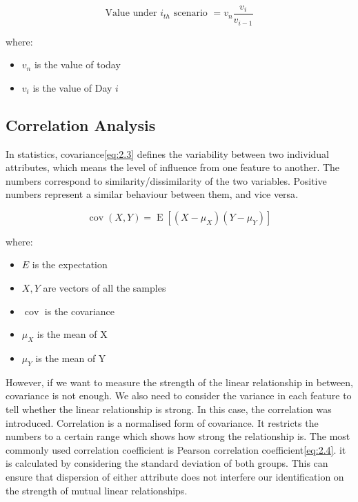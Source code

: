 \documentclass[11pt]{article} %
\theoremstyle{plain}
\theoremstyle{definition}
\begin{document}
{
  \begin{equation}
    \label{eq:2.2}
    \tag{2.2}
    {\text{Value under } i_{th} \text{ scenario } = v_{n}\frac{v_{i}}{v_{i-1}}}
  \end{equation}

  \footnotesize
  where:
  \begin{itemize}[label=-, leftmargin=4em, itemsep=0.1em]
    \item $v_{n}$ is the value of today
    \item $v_{i}$ is the value of Day $i$
  \end{itemize}
}

\subsection{Correlation Analysis}

In statistics, covariance\eqref{eq:2.3} defines the variability between two individual attributes, which means the level of influence from one feature to another. The numbers correspond to similarity/dissimilarity of the two variables. Positive numbers represent a similar behaviour between them, and vice versa\cite{wiki/cov:2018}.

{
  \begin{equation}
    \label{eq:2.3}
    \tag{2.3}
    {\operatorname {cov} (X,Y)=\operatorname {E} [(X-\mu _{X})(Y-\mu _{Y})]}
  \end{equation}

  \footnotesize
  where:
  \begin{itemize}[label=-, leftmargin=4em, itemsep=0.1em]
    \item ${E}$ is the expectation
    \item ${X, Y}$ are vectors of all the samples
    \item $\operatorname {cov}$ is the covariance
    \item ${\mu}_{X}$ is the mean of X
    \item ${\mu}_{Y}$ is the mean of Y
  \end{itemize}
}

However, if we want to measure the strength of the linear relationship in between, covariance is not enough. We also need to consider the variance in each feature to tell whether the linear relationship is strong. In this case, the correlation was introduced. Correlation is a normalised form of covariance. It restricts the numbers to a certain range which shows how strong the relationship is. The most commonly used correlation coefficient is Pearson correlation coefficient\eqref{eq:2.4}. it is calculated by considering the standard deviation of both groups. This can ensure that dispersion of either attribute does not interfere our identification on the strength of mutual linear relationships\cite{ghall/pcc:2015}.
\end{document}
